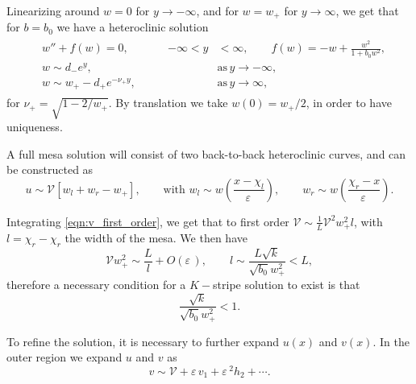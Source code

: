 \documentclass[a4paper,10pt]{article}
\newcommand{\Ep}{\ensuremath{\varepsilon\,}}
\newcommand{\VV}{\ensuremath{\mathcal{V}}}
\begin{document}
Linearizing around $w=0$ for $y\rightarrow -\infty$, and for $w=w_+$ for $y\rightarrow \infty$, we get that for $b=b_0$ we have a heteroclinic solution 
% 
\begin{equation}
\label{eqn:hetero}
\begin{split}
\begin{aligned}
  &w''+f(w)=0,\qquad &-\infty<y&<\infty,\qquad f(w) = -w + \frac{w^2}{1+b_0w^2},\\
  &w\sim d_-e^y,\qquad &&\mathrm{as}\hspace{2pt}y\rightarrow -\infty,\\
  &w\sim w_+ - d_+e^{-\nu_+y},\qquad&&\mathrm{as}\hspace{2pt}y\rightarrow \infty,
\end{aligned}
\end{split}
\end{equation}
% 
for $\nu_+ = \sqrt{1-2/w_+}$. By translation we take $w(0)=w_+/2$, in order to have uniqueness.

A full mesa solution will consist of two back-to-back heteroclinic curves, and can be constructed as
% 
\begin{equation}
  u\sim \VV[w_l + w_r - w_+],\qquad  \textrm{with }w_l\sim w\left(\frac{x-\chi_l}{\Ep}\right),\qquad w_r\sim w\left(\frac{\chi_r-x}{\Ep}\right).
\end{equation}
% 

Integrating \eqref{eqn:v_first_order}, we get that to first order $\VV\sim\frac{1}{L}\VV^2w_+^2l$, with $l=\chi_r-\chi_r$ the width of the mesa. We then have
% 
\begin{equation}
  \VV w_+^2\sim\frac{L}{l} + O(\Ep),\qquad l\sim\frac{L\sqrt{k}}{\sqrt{b_0}w_+^2}<L,
\end{equation}
% 
therefore a necessary condition for a $K-$stripe solution to exist is that 
% 
\begin{equation}
  \frac{\sqrt{k}}{\sqrt{b_0}w_+^2}<1.
\end{equation}
% 

To refine the solution, it is necessary to further expand $u(x)$ and $v(x)$. In the outer region we expand $u$ and $v$ as
$$
v\sim \VV + \Ep v_1 + \Ep^2 h_2 + \cdots.
$$
\end{document}
